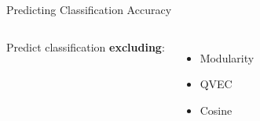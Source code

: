 \documentclass[compress]{beamer}
\begin{document}
\begin{frame}{Predicting Classification Accuracy}

\begin{columns}
  Predict classification {\bf excluding}:
  \begin{itemize}
    \item \alert<3>{Modularity}
    \item \alert<2>{QVEC}
    \item \alert<1>{Cosine}
  \end{itemize}
  \begin{center}

\end{center}
\end{columns}
\end{frame}
\end{document}
